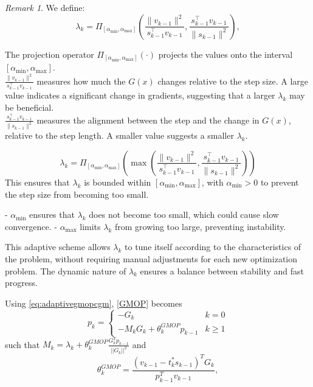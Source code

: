 \documentclass{article}
\theoremstyle{remark}
\newtheorem{remark}{Remark}
\begin{document}
{\begin{remark}
We define:
\[
    \lambda_k = \Pi_{[\alpha_{\min}, \alpha_{\max}]}\left( \frac{\|v_{k-1}\|^2}{s_{k-1}^\top v_{k-1}}, \frac{s_{k-1}^\top v_{k-1}}{\|s_{k-1}\|^2} \right),
\]

The projection operator $\Pi_{[\alpha_{\min}, \alpha_{\max}]}(\cdot)$ projects the values onto the interval $[\alpha_{\min}, \alpha_{\max}]$.\\
   $\frac{\|v_{k-1}\|^2}{s_{k-1}^\top v_{k-1}}$ measures how much the $G(x)$ changes relative to the step size. A large value indicates a significant change in gradients, suggesting that a larger $\lambda_k$ may be beneficial.\\
   $ \frac{s_{k-1}^\top v_{k-1}}{\|s_{k-1}\|^2}$
   measures the alignment between the step and the change in $G(x)$, relative to the step length. A smaller value suggests a smaller $\lambda_k$.

\begin{equation}
    \label{eq:adaptivegmopcgm}
\lambda_k = \Pi_{[\alpha_{\min}, \alpha_{\max}]}\left(\max\left(\frac{\|v_{k-1}\|^2}{s_{k-1}^\top v_{k-1}}, \frac{s_{k-1}^\top v_{k-1}}{\|s_{k-1}\|^2}\right)\right)
\end{equation}
This ensures that $\lambda_k$ is bounded within $[\alpha_{\min}, \alpha_{\max}]$, with $\alpha_{\min} > 0$ to prevent the step size from becoming too small.

- $\alpha_{\min}$ ensures that $\lambda_k$ does not become too small, which could cause slow convergence.
- $\alpha_{\max}$ limits $\lambda_k$ from growing too large, preventing instability.

This adaptive scheme allows $\lambda_k$ to tune itself according to the characteristics of the problem, without requiring manual adjustments for each new optimization problem. The dynamic nature of $\lambda_k$ ensures a balance between stability and fast progress.

\end{remark}
Using \eqref{eq:adaptivegmopcgm}, \eqref{GMOP} becomes
\begin{equation}
p_k=\begin{cases}\label{eq:adaptGMOP}
    -G_k & k=0\\
    -M_kG_k+\theta_k^{GMOP}p_{k-1} & k\geq 1
\end{cases}
\end{equation}
such that $M_k=\lambda_k +\theta_k^{GMOP}\frac{G_k^Tp_{k-1}}{||G_k||^2}$ and 
\begin{equation}
    \label{eq:optimalconjpamop}
    \theta_k^{GMOP}=\frac{(v_{k-1}-t_k^*s_{k-1})^TG_k}{p_{k-1}^Tv_{k-1}},
\end{equation}

}
\end{document}
